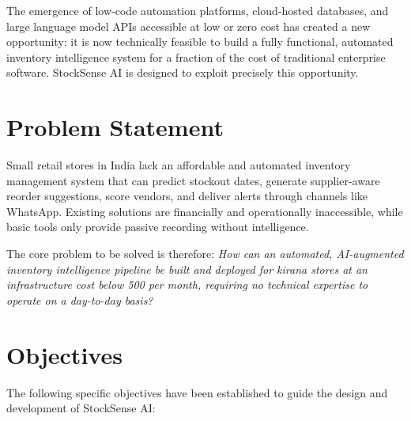 The emergence of low-code automation platforms, cloud-hosted databases, and large language model
APIs accessible at low or zero cost has created a new opportunity: it is now technically feasible
to build a fully functional, automated inventory intelligence system for a fraction of the cost
of traditional enterprise software. StockSense AI is designed to exploit precisely this
opportunity.

\section{Problem Statement}

Small retail stores in India lack an affordable and automated inventory management system that can predict stockout dates, generate supplier-aware reorder suggestions, score vendors, and deliver alerts through channels like WhatsApp. Existing solutions are financially and operationally inaccessible, while basic tools only provide passive recording without intelligence.

The core problem to be solved is therefore: \textit{How can an automated, AI-augmented inventory
intelligence pipeline be built and deployed for kirana stores at an infrastructure cost below
\rupee{}500 per month, requiring no technical expertise to operate on a day-to-day basis?}

\section{Objectives}

The following specific objectives have been established to guide the design and development of
StockSense AI:

